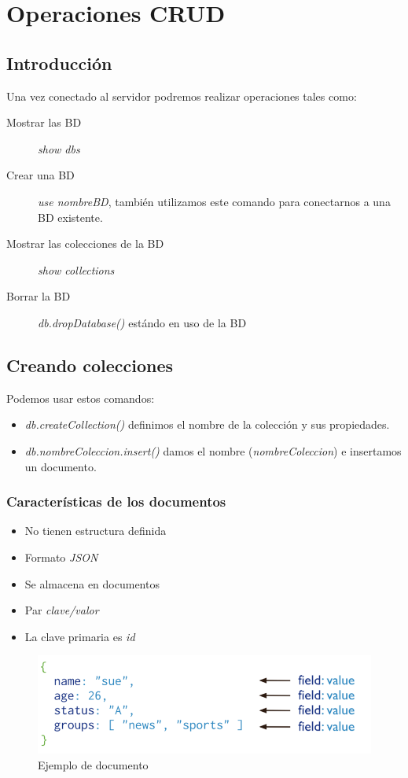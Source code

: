 \documentclass[4paper]{article}
\begin{document}
\newpage
\section{Operaciones CRUD}
\subsection{Introducción}
Una vez conectado al servidor podremos realizar operaciones tales como:
\begin{description}
\item[Mostrar las BD] \emph{show dbs}
\item[Crear una BD] \emph{use nombreBD}, también utilizamos este comando para conectarnos a una BD existente.
\item[Mostrar las colecciones de la BD] \emph{show collections}
\item[Borrar la BD] \emph{db.dropDatabase()}  estándo en uso de la BD
\end{description}

\subsection{Creando colecciones}
Podemos usar estos comandos:
\begin{itemize}
\item \emph{db.createCollection()} definimos el nombre de la colección y sus propiedades.
\item \emph{db.nombreColeccion.insert()} damos el nombre (\emph{nombreColeccion}) e insertamos un documento.
\end{itemize}

\subsubsection{Características de los documentos}
\begin{itemize}
\item No tienen estructura definida
\item Formato \emph{JSON}
\item Se almacena en documentos
\item Par \emph{clave/valor}
\item La clave primaria es \emph{\-id}
\end{itemize}
\begin{figure}[H]
\includegraphics[scale=0.5]{documentos.png}
\caption{Ejemplo de documento}
\end{figure}
\end{document}
